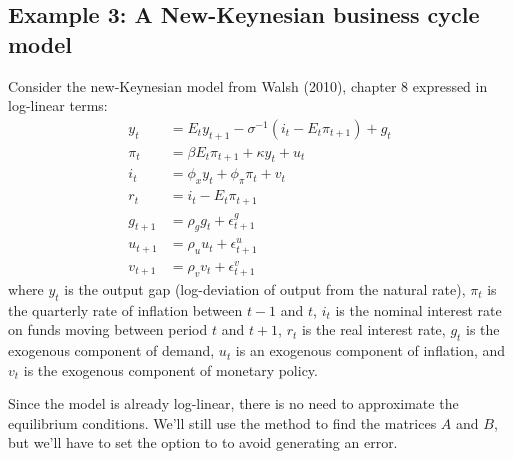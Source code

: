 \documentclass[letterpaper,10pt,openany,oneside,english]{sphinxmanual}
\begin{document}
\noindent{}

\noindent{}

\noindent{}


\subsection{Example 3: A New-Keynesian business cycle model}
\label{\detokenize{examples:Example-3:-A-New-Keynesian-business-cycle-model}}
Consider the new-Keynesian model from Walsh (2010), chapter 8 expressed
in log-linear terms:
\label{\detokenize{examples:equation-examples:10}}\label{equation:examples:examples:10}\begin{align}
y_t & = E_ty_{t+1} - \sigma^{-1} (i_t - E_t\pi_{t+1}) + g_t\\
\pi_t & = \beta  E_t\pi_{t+1} + \kappa  y_t + u_t\\
i_t & = \phi_x  y_t + \phi_{\pi}  \pi_t + v_t\\
r_t & = i_t - E_t\pi_{t+1}\\
g_{t+1} & = \rho_g g_{t} + \epsilon_{t+1}^g\\
u_{t+1} & = \rho_u u_{t} + \epsilon_{t+1}^u\\
v_{t+1} & = \rho_v v_{t} + \epsilon_{t+1}^v
\end{align}
where \(y_t\) is the output gap (log-deviation of output from the
natural rate), \(\pi_t\) is the quarterly rate of inflation between
\(t-1\) and \(t\), \(i_t\) is the nominal interest rate on
funds moving between period \(t\) and \(t+1\), \(r_t\) is
the real interest rate, \(g_t\) is the exogenous component of
demand, \(u_t\) is an exogenous component of inflation, and
\(v_t\) is the exogenous component of monetary policy.

Since the model is already log-linear, there is no need to approximate
the equilibrium conditions. We'll still use the  method
to find the matrices \(A\) and \(B\), but we'll have to set the
 option to  to avoid generating an error.
\end{document}

